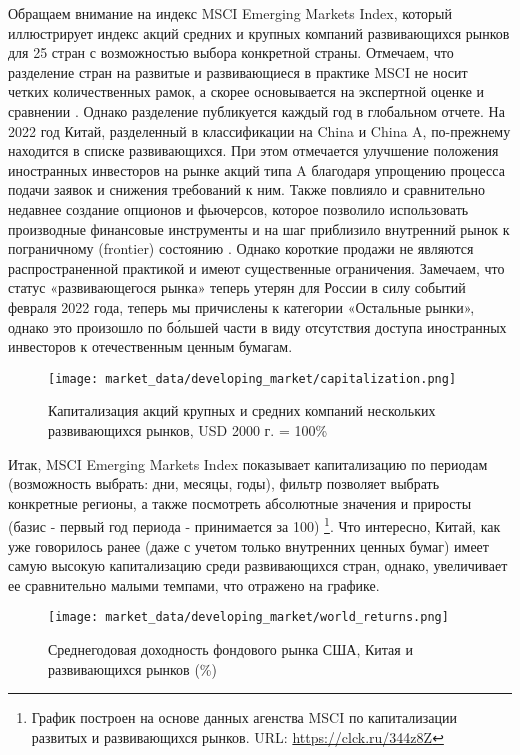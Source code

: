 Обращаем внимание на индекс MSCI Emerging Markets Index, который иллюстрирует индекс акций средних и крупных компаний развивающихся рынков для 25 стран \cite{investopedia2023emerging} с возможностью выбора конкретной страны. Отмечаем, что разделение стран на развитые и развивающиеся в практике MSCI не носит четких количественных рамок, а скорее основывается на экспертной оценке и сравнении \cite{investprovit2023developed}. Однако разделение публикуется каждый год в глобальном отчете. На 2022 год Китай, разделенный в классификации на China и China A, по-прежнему находится в списке развивающихся. При этом отмечается улучшение положения иностранных инвесторов на рынке акций типа A благодаря упрощению процесса подачи заявок и снижения требований к ним. Также повлияло и сравнительно недавнее создание опционов и фьючерсов, которое позволило использовать производные финансовые инструменты и на шаг приблизило внутренний рынок к пограничному (frontier) состоянию \cite{msci2022msci}. Однако короткие продажи не являются распространенной практикой и имеют существенные ограничения. Замечаем, что статус «развивающегося рынка» теперь утерян для России в силу событий февраля 2022 года, теперь мы причислены к категории «Остальные рынки», однако это произошло по б\'{о}льшей части в виду отсутствия доступа иностранных инвесторов к отечественным ценным бумагам.

\begin{figure}[H]
	\centering
	\texttt{[image: market\_data/developing\_market/capitalization.png]}
	\caption{Капитализация акций крупных и средних компаний нескольких развивающихся рынков, USD 2000 г. = 100\%}
\end{figure}

\noindent Итак, MSCI Emerging Markets Index показывает капитализацию по периодам (возможность выбрать: дни, месяцы, годы), фильтр позволяет выбрать конкретные регионы, а также посмотреть абсолютные значения и приросты (базис - первый год периода - принимается за 100) \footnote{График построен на основе данных агенства MSCI по капитализации развитых и развивающихся рынков. URL: \url{https://clck.ru/344z8Z}}. Что интересно, Китай, как уже говорилось ранее (даже с учетом только внутренних ценных бумаг) имеет самую высокую капитализацию среди развивающихся стран, однако, увеличивает ее сравнительно малыми темпами, что отражено на графике.

\begin{figure}[H]
	\centering
	\texttt{[image: market\_data/developing\_market/world\_returns.png]}
	\caption{Среднегодовая доходность фондового рынка США, Китая и развивающихся рынков (\%)}
	\label{pic::world_returns_last}
\end{figure}


